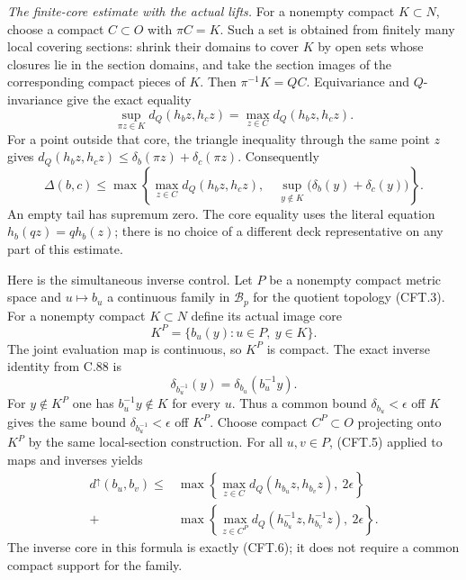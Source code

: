 \emph{The finite-core estimate with the actual lifts.}
For a nonempty compact $K\subset N$, choose a compact $C\subset O$
with $\pi C=K$. Such a set is obtained from finitely many
local covering sections: shrink their domains to cover $K$
by open sets whose closures lie in the section domains, and
take the section images of the corresponding compact pieces
of $K$. Then $\pi^{-1}K=QC$. Equivariance and $Q$-invariance
give the exact equality
\[
 \sup_{\pi z\in K}d_Q(h_bz,h_cz)
       =\max_{z\in C}d_Q(h_bz,h_cz).
                                                               \tag{CFT.4}
\]
For a point outside that core, the triangle inequality through
the same point $z$ gives
$d_Q(h_bz,h_cz)\leq\delta_b(\pi z)+\delta_c(\pi z)$.
Consequently
\[
 \Delta(b,c)\leq
 \max\left\{
   \max_{z\in C}d_Q(h_bz,h_cz),\quad
   \sup_{y\notin K}\bigl(\delta_b(y)+\delta_c(y)\bigr)
 \right\}.
                                                               \tag{CFT.5}
\]
An empty tail has supremum zero. The core equality uses the
literal equation $h_b(qz)=qh_b(z)$; there is no choice of a
different deck representative on any part of this estimate.

Here is the simultaneous inverse control. Let $P$ be a nonempty compact
metric space and $u\mapsto b_u$ a continuous family in
$\mathscr B_p$ for the quotient topology (CFT.3). For a nonempty compact
$K\subset N$ define its actual image core
\[
              K^P=\{b_u(y):u\in P,\ y\in K\}.
                                                               \tag{CFT.6}
\]
The joint evaluation map is continuous, so $K^P$ is compact.
The exact inverse identity from C.88 is
\[
              \delta_{b_u^{-1}}(y)
                    =\delta_{b_u}(b_u^{-1}y).
                                                               \tag{CFT.7}
\]
For $y\notin K^P$ one has $b_u^{-1}y\notin K$ for every $u$.
Thus a common bound $\delta_{b_u}<\epsilon$ off $K$ gives the
same bound $\delta_{b_u^{-1}}<\epsilon$ off $K^P$.
Choose compact $C^P\subset O$ projecting onto $K^P$ by the
same local-section construction. For all $u,v\in P$, (CFT.5)
applied to maps and inverses yields
\[
\begin{split}
 d^\uparrow(b_u,b_v)\leq
 &\max\left\{\max_{z\in C}d_Q(h_{b_u}z,h_{b_v}z),\ 2\epsilon\right\}\\
 {}+&\max\left\{\max_{z\in C^P}
            d_Q(h_{b_u}^{-1}z,h_{b_v}^{-1}z),\ 2\epsilon\right\}.
\end{split}                                                    \tag{CFT.8}
\]
The inverse core in this formula is exactly (CFT.6); it does
not require a common compact support for the family.


